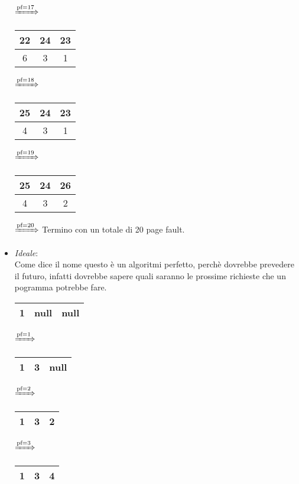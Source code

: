 \documentclass{article}
\begin{document}
\begin{itemize}
            $\xRightarrow{\text{pf}=17}$
            \begin{tabular}{|c|c|c|}
                \hline
                22 & 24 & 23\\
                \hline
                6 & 3 & 1\\
                \hline
            \end{tabular}
            $\xRightarrow{\text{pf}=18}$
            \begin{tabular}{|c|c|c|}
                \hline
                25 & 24 & 23\\
                \hline
                4 & 3 & 1\\
                \hline
            \end{tabular}
            $\xRightarrow{\text{pf}=19}$
            \begin{tabular}{|c|c|c|}
                \hline
                25 & 24 & 26\\
                \hline
                4 & 3 & 2\\
                \hline
            \end{tabular}
            $\xRightarrow{\text{pf}=20}$
            Termino con un totale di 20 page fault.
        \item \emph{Ideale}:\\
        Come dice il nome questo è un algoritmi perfetto, perchè dovrebbe prevedere il futuro, infatti dovrebbe sapere quali saranno le prossime richieste che un pogramma potrebbe fare.\\
        \begin{tabular}{|c|c|c|}
            \hline
            1 & null & null\\
            \hline
        \end{tabular}
        $\xRightarrow{\text{pf}=1}$
        \begin{tabular}{|c|c|c|}
            \hline
            1 & 3 & null\\
            \hline
        \end{tabular}
        $\xRightarrow{\text{pf}=2}$
        \begin{tabular}{|c|c|c|}
            \hline
            1 & 3 & 2\\
            \hline
        \end{tabular}
        $\xRightarrow{\text{pf}=3}$
        \begin{tabular}{|c|c|c|}
            \hline
            1 & 3 & 4\\
            \hline

\end{tabular}
\end{itemize}
\end{document}
